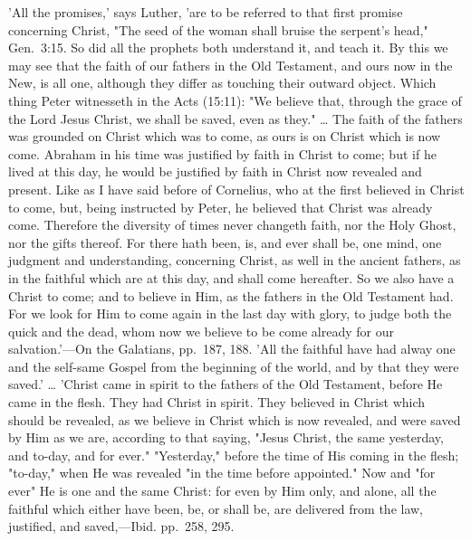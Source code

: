 \documentclass[
]{book}
\begin{document}
{  'All the promises,' says Luther, 'are to be referred to that first promise concerning Christ, "The seed of the woman shall bruise the serpent's head," Gen.~3:15. So did all the prophets both understand it, and teach it. By this we may see that the faith of our fathers in the Old Testament, and ours now in the New, is all one, although they differ as touching their outward object. Which thing Peter witnesseth in the Acts (15:11): "We believe that, through the grace of the Lord Jesus Christ, we shall be saved, even as they." \ldots{} The faith of the fathers was grounded on Christ which was to come, as ours is on Christ which is now come. Abraham in his time was justified by faith in Christ to come; but if he lived at this day, he would be justified by faith in Christ now revealed and present. Like as I have said before of Cornelius, who at the first believed in Christ to come, but, being instructed by Peter, he believed that Christ was already come. Therefore the diversity of times never changeth faith, nor the Holy Ghost, nor the gifts thereof. For there hath been, is, and ever shall be, one mind, one judgment and understanding, concerning Christ, as well in the ancient fathers, as in the faithful which are at this day, and shall come hereafter. So we also have a Christ to come; and to believe in Him, as the fathers in the Old Testament had. For we look for Him to come again in the last day with glory, to judge both the quick and the dead, whom now we believe to be come already for our salvation.'---On the Galatians, pp.~187, 188. 'All the faithful have had alway one and the self-same Gospel from the beginning of the world, and by that they were saved.' \ldots{} 'Christ came in spirit to the fathers of the Old Testament, before He came in the flesh. They had Christ in spirit. They believed in Christ which should be revealed, as we believe in Christ which is now revealed, and were saved by Him as we are, according to that saying, "Jesus Christ, the same yesterday, and to-day, and for ever." "Yesterday," before the time of His coming in the flesh; "to-day," when He was revealed "in the time before appointed." Now and "for ever" He is one and the same Christ: for even by Him only, and alone, all the faithful which either have been, be, or shall be, are delivered from the law, justified, and saved,---Ibid. pp.~258, 295.}
\end{document}
